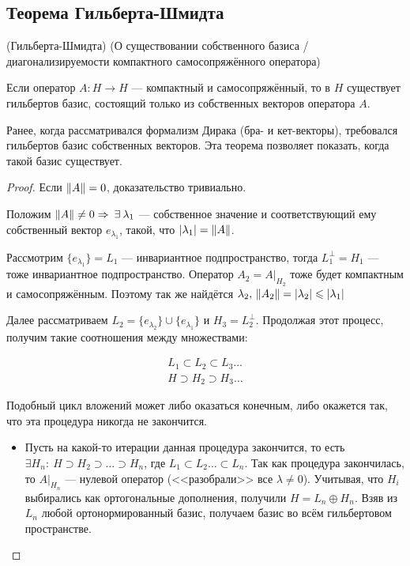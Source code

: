 \documentclass[12pt]{article}
\begin{document}
	\subsection{Теорема Гильберта-Шмидта}
	\begin{theorem}
		(Гильберта-Шмидта) (О существовании {\color{gray}собственного} базиса
		/диагонализируемости компактного самосопряжённого оператора)
		
		Если оператор $A : H \rightarrow H$ --- компактный и самосопряжённый, то в $H$ существует гильбертов 
		базис, состоящий только из собственных векторов оператора $A$.
	\end{theorem}
	Ранее, когда рассматривался формализм Дирака (бра- и кет-векторы), требовался гильбертов базис собственных
	векторов. Эта теорема позволяет показать, когда такой базис существует.
	\begin{proof}
		Если $\left\| A \right\| = 0$, доказательство тривиально.
		
		Положим $\norm{A} \neq 0 \Rightarrow \exists \lambda_1$ --- собственное значение и соответствующий ему 
		собственный вектор $e_{\lambda_1}$, такой, что $\left| \lambda_1 \right| = \left\| A \right\|$.
		
		Рассмотрим $\{e_{\lambda_1}\} = L_1$ --- инвариантное подпространство, тогда $L_1^{\perp} = H_1$ --- тоже инвариантное 
		подпространство. Оператор $A_2 = A|_{H_2}$ тоже будет компактным и самосопряжённым. Поэтому так же найдётся
		$\lambda_2,\, \left\| A_2 \right\| = \left| \lambda_2 \right| \leqslant \left| \lambda_1 \right|$
		
		Далее рассматриваем $L_2 = \{e_{\lambda_2}\} \cup \{e_{\lambda_1}\}$ и $H_3 = L_2^{\perp}$. Продолжая этот 
		процесс, получим такие соотношения между множествами:
		
		\begin{gather*}
			L_1 \subset L_2 \subset L_3 \dots \\
			H \supset H_2 \supset H_3 \dots
		\end{gather*}
		
		Подобный цикл вложений может либо оказаться конечным, либо окажется так, что эта процедура никогда не закончится.

		\begin{itemize}
		\item Пусть на какой-то итерации данная процедура закончится, то есть $\exists H_n:\: H \supset H_2 \supset \dots \supset H_n$,
			где $L_1 \subset L_2 \dots \subset L_n$. Так как процедура закончилась, то $A|_{H_n}$ --- нулевой оператор (<<разобрали>>
			все $\lambda \neq 0$). Учитывая, что $H_i$ выбирались как ортогональные дополнения, получили $H = L_n \oplus H_n$. 
			Взяв из $L_n$ любой ортонормированный базис, получаем базис во всём гильбертовом пространстве.
		

\end{itemize}
\end{proof}
\end{document}
